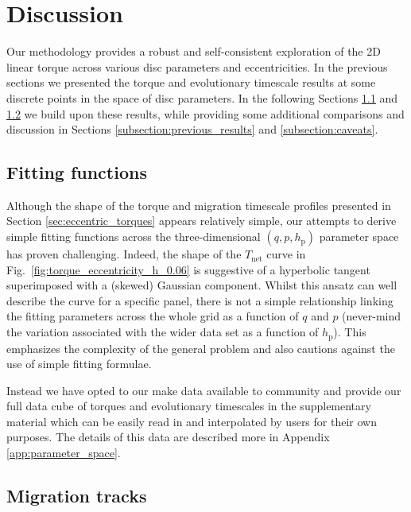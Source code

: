 \section{Discussion}
\label{sec:discussion}


Our methodology provides a robust and self-consistent exploration of the 2D linear torque across various disc parameters and eccentricities. In the previous sections we presented the torque and evolutionary timescale results at some discrete points in the space of disc parameters. In the following Sections \ref{subsection:fitting_functions} and \ref{subsection:migration_tracks} we build upon these results, while providing some additional comparisons and discussion in Sections \ref{subsection:previous_results} and \ref{subsection:caveats}.


\subsection{Fitting functions}
\label{subsection:fitting_functions}

Although the shape of the torque and migration timescale profiles presented in Section \ref{sec:eccentric_torques} appears relatively simple, our attempts to derive simple fitting functions across the three-dimensional $(q,p,h_\mathrm{p})$ parameter space has proven challenging. Indeed, the shape of the $T_\textrm{net}$ curve in Fig.~\ref{fig:torque_eccentricity_h_0.06} is suggestive of a hyperbolic tangent superimposed with a (skewed) Gaussian component. Whilst this ansatz can well describe the curve for a specific panel, there is not a simple relationship linking the fitting parameters across the whole grid as a function of $q$ and $p$ (never-mind the variation associated with the wider data set as a function of $h_\textrm{p}$). This emphasizes the complexity of the general problem and also cautions against the use of simple fitting formulae. 

Instead we have opted to our make data available to community and provide our full data cube of torques and evolutionary timescales in the supplementary material which can be easily read in and interpolated by users for their own purposes. The details of this data are described more in Appendix \ref{app:parameter_space}.

\subsection{Migration tracks}
\label{subsection:migration_tracks}

